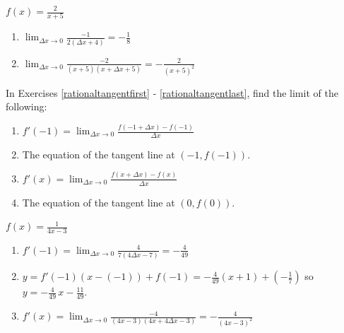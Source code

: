 \documentclass{ximera}
\begin{document}
\begin{question}
\begin{problem} \label{diffquotexerlastb}
$f(x) = \frac{2}{x+5}$

\begin{solution}
\begin{enumerate}
\item $\lim_{\Delta x \rightarrow 0} \frac{-1}{2(\Delta x+4)} = - \frac{1}{8}$

\item $\lim_{\Delta x \rightarrow 0} \frac{-2}{(x+5)(x+\Delta x+5)}=  - \frac{2}{(x+5)^2}$
\end{enumerate}
\end{solution}
\end{problem}
  
\end{question}

\begin{question}
In Exercises \ref{rationaltangentfirst} - \ref{rationaltangentlast}, find the limit of the following:

\begin{enumerate}

\item  $f'(-1) = \lim_{\Delta x \rightarrow 0} \frac{f(-1+\Delta x) - f(-1)}{\Delta x}$

\item The equation of the tangent line at $(-1, f(-1))$.

\item  $f'(x) = \lim_{\Delta x \rightarrow 0} \frac{f(x+\Delta x) - f(x)}{\Delta x}$

\item  The equation of the tangent line at $(0,f(0))$.

\end{enumerate}

\begin{problem}\label{rationaltangentfirst} 
$f(x) = \frac{1}{4x-3}$ 

\begin{solution}
\begin{enumerate}

\item  $f'(-1) =\lim_{\Delta x \rightarrow 0} \frac{4}{7(4 \Delta x - 7)} = - \frac{4}{49}$

\item $y = f'(-1)(x-(-1)) + f(-1) = -\frac{4}{49}(x + 1) + \left(-\frac{1}{7}\right)$ so $y = -\frac{4}{49} \, x - \frac{11}{49}$.   

\item  $f'(x) = \lim_{\Delta x \rightarrow 0} \frac{-4}{(4x-3)(4x+4\Delta x-3)} =  - \frac{4}{(4x-3)^2}$  


\end{enumerate}
\end{solution}
\end{problem}
\end{question}
\end{document}
